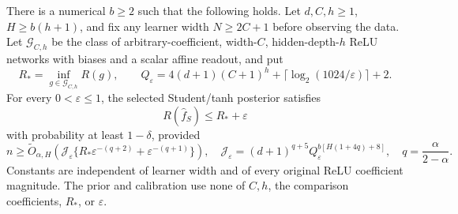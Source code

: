 \begin{theorem}
\label{thm:Student-Boolean-width}
There is a numerical $b\ge2$ such that the following holds. Let $d,C,h\ge1$, $H\ge b(h+1)$, and fix any learner width $N\ge2C+1$ before observing the data. Let $\mathcal G_{C,h}$ be the class of arbitrary-coefficient, width-$C$, hidden-depth-$h$ ReLU networks with biases and a scalar affine readout, and put
\[
 R_* =\inf_{g\in\mathcal G_{C,h}}R(g),\qquad
 Q_\varepsilon=4(d+1)(C+1)^h+
                      \lceil\log_2(1024/\varepsilon)\rceil+2.
\]
For every $0<\varepsilon\le1$, the selected Student/tanh posterior satisfies
\[
 R(\widehat f_S)\le R_*+\varepsilon
\]
with probability at least $1-\delta$, provided
\begin{equation}
 n\ge\widetilde O_{\alpha,H}\left(
  \mathcal J_\varepsilon
   \{R_*\varepsilon^{-(q+2)}+\varepsilon^{-(q+1)}\}\right),
 \quad
 \mathcal J_\varepsilon=(d+1)^{q+5}
             Q_\varepsilon^{b[H(1+4q)+8]},
 \quad q=\frac\alpha{2-\alpha}.
 \label{eq:Student-Boolean-samples}
\end{equation}
Constants are independent of learner width and of every original ReLU coefficient magnitude. The prior and calibration use none of $C,h$, the comparison coefficients, $R_*$, or $\varepsilon$.
\end{theorem}
